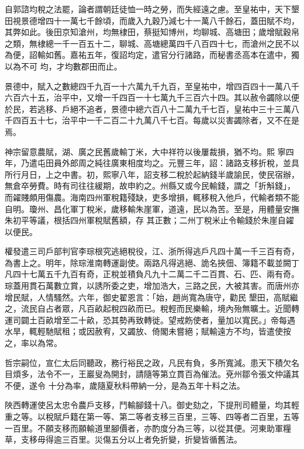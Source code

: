 \begin{pinyinscope}
 自郭諮均稅之法罷，論者謂朝廷徒恤一時之勞，而失經遠之慮。至皇祐中，天下墾田視景德增四十一萬七千餘頃，而歲入九穀乃減七十一萬八千餘石，蓋田賦不均，其弊如此。後田京知滄州，均無棣田，蔡挺知博州，均聊城、高塘田；歲增賦穀帛之類，無棣總一千一百五十二，聊城、高塘總萬四千八百四十七，而滄州之民不以為便，詔輸如舊。嘉祐五年，復詔均定，遣官分行諸路，而秘書丞高本在遣中，獨以為不可
 均，才均數郡田而止。



 景德中，賦入之數總四千九百一十六萬九千九百，至皇祐中，增四百四十一萬八千六百六十五，治平中，又增一千四百一十七萬九千三百六十四。其以赦令蠲除以便於民，若逃移、戶絕不追者，景德中總六百八十二萬九千七百，皇祐中三十三萬八千四百五十七，治平中一千二百二十九萬八千七百。每歲以災害蠲除者，又不在是焉。



 神宗留意農賦，湖、廣之民舊歲輸丁米，大中祥符以後屢裁損，猶不均。熙
 寧四年，乃遣屯田員外郎周之純往廣東相度均之。元豐三年，詔：諸路支移折稅，並具所行月日，上之中書。初，熙寧八年，詔支移二稅於起納錢半歲諭民，使民宿辦，無倉卒勞費。時有司往往緩期，故申約之。州縣又或今民輸錢，謂之「折斛錢」，而糴賤頗用傷農。海南四州軍稅籍殘缺，吏多增損，輒移稅入他戶，代輸者類不能自明。瓊州、昌化軍丁稅米，歲移輸朱崖軍，道遠，民以為苦。至是，用體量安撫朱初平等議，根括四州軍稅賦舊額，存
 其正數；二州丁稅米止令輸錢於朱崖自糴以便民。



 權發遣三司戶部判官李琮根究逃絕稅役，江、浙所得逃戶凡四十萬一千三百有奇，為書上之。明年，除琮淮南轉運副使。兩路凡得逃絕、詭名挾佃、簿籍不載並闕丁凡四十七萬五千九百有奇，正稅並積負凡九十二萬二千二百貫、石、匹、兩有奇。琮蓋用貫石萬數立賞，以誘所委之吏，增加浩大，三路之民，大被其害。而唐州亦增民賦，人情騷然。六年，御史翟恩言：「始，趙尚寬為唐守，勸民
 墾田，高賦繼之，流民自占者眾，凡百畝起稅四畝而已。稅輕而民樂輸，境內殆無曠土。近聞轉運司闢土百畝增至二十畝，恐其勢再致轉徙。望戒飭使者，量加以寬民。」帝每遇水旱，輒輕馳賦租；或因赦宥，又蠲放、倚閣未嘗絕；賦輸遠方不均，皆遣使按之，率以為常。



 哲宗嗣位，宣仁太后同聽政，務行裕民之政，凡民有負，多所寬減。患天下積欠名目煩多，法令不一，王巖叟為開封，請隨等第立貫百為催法。兗州鄒令張文仲議其不便，遂令
 十分為率，歲隨夏秋料帶納一分，是為五年十料之法。



 陜西轉運使呂太忠令農戶支移，鬥輸腳錢十八。御史劾之，下提刑司體量，均其輕重之等。以稅賦戶籍在第一等、第二等者支移三百里，三等、四等者二百里，五等一百里。不願支移而願輸道里腳價者，亦酌度分為三等，以從其便。河東助軍糧草，支移毋得逾三百里。災傷五分以上者免折變，折變皆循舊法。




\end{pinyinscope}
